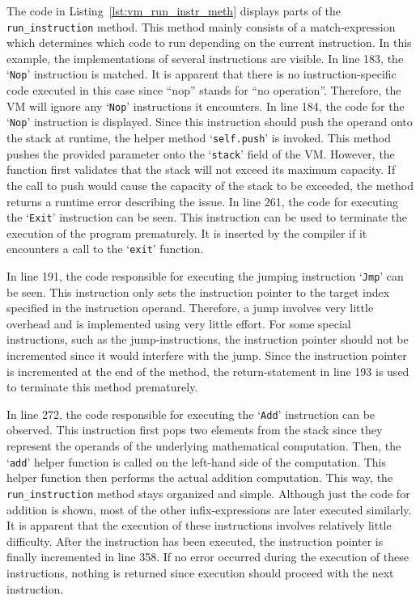 
The code in Listing~\ref{lst:vm_run_instr_meth} displays parts of the \texttt{run\_instruction} method.
This method mainly consists of a match-expression which determines which code to run depending on the current instruction.
In this example, the implementations of several instructions are visible.
In line 183, the `\texttt{Nop}' instruction is matched.
It is apparent that there is no instruction-specific code executed in this case since \enquote{nop} stands for \enquote{no operation}.
Therefore, the VM will ignore any `\texttt{Nop}' instructions it encounters.
In line 184, the code for the `\texttt{Nop}' instruction is displayed.
Since this instruction should push the operand onto the stack at runtime, the helper method `\texttt{self.push}' is invoked.
This method pushes the provided parameter onto the `\texttt{stack}' field of the VM\@.
However, the function first validates that the stack will not exceed its maximum capacity.
If the call to push would cause the capacity of the stack to be exceeded, the method returns a runtime error describing the issue.
In line 261, the code for executing the `\texttt{Exit}' instruction can be seen.
This instruction can be used to terminate the execution of the program prematurely.
It is inserted by the compiler if it encounters a call to the `\texttt{exit}' function.

In line 191, the code responsible for executing the jumping instruction `\texttt{Jmp}' can be seen.
This instruction only sets the instruction pointer to the target index specified in the instruction operand.
Therefore, a jump involves very little overhead and is implemented using very little effort.
For some special instructions, such as the jump-instructions, the instruction pointer should not be incremented since it would interfere with the jump.
Since the instruction pointer is incremented at the end of the method, the return-statement in line 193 is used to terminate this method prematurely.

In line 272, the code responsible for executing the `\texttt{Add}' instruction can be observed.
This instruction first pops two elements from the stack since they represent the operands of the underlying mathematical computation.
Then, the `\texttt{add}' helper function is called on the left-hand side of the computation.
This helper function then performs the actual addition computation.
This way, the \texttt{run\_instruction} method stays organized and simple.
Although just the code for addition is shown, most of the other infix-expressions are later executed similarly.
It is apparent that the execution of these instructions involves relatively little difficulty.
After the instruction has been executed, the instruction pointer is finally incremented in line 358.
If no error occurred during the execution of these instructions, nothing is returned since execution should proceed with the next instruction.

